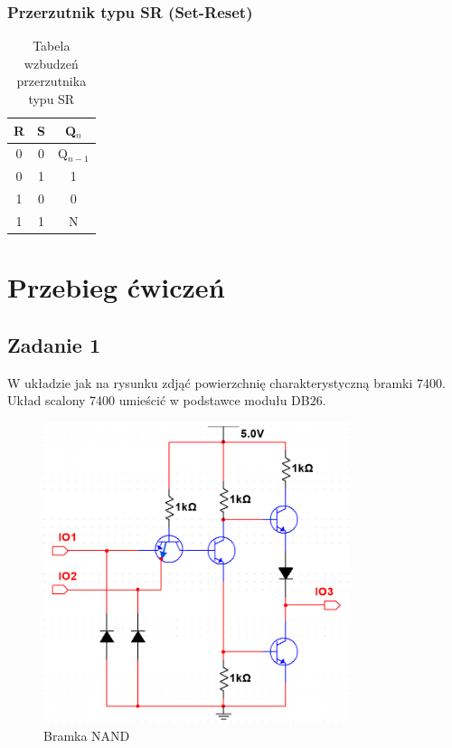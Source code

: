\documentclass{article}
\begin{document}
    \subsubsection{Przerzutnik typu SR (Set-Reset)}
    \begin{table}[H]
    	\centering
    	\begin{tabular}{|c|c|c|}
    		\hline
    		\textbf{R} & \textbf{S} & \textbf{Q$_n$} \\ \hline
    		0 & 0 & Q$_{n-1}$ \\ 
    		0 & 1 & 1 \\ 
    		1 & 0 & 0 \\ 
    		1 & 1 & N \\ 
    		\hline
    	\end{tabular}
    	\caption{Tabela wzbudzeń przerzutnika typu SR}
    \end{table}
    

    \pagebreak

\pagebreak
\section{Przebieg ćwiczeń}
\subsection{Zadanie 1}
W układzie jak na rysunku zdjąć powierzchnię charakterystyczną bramki 7400. Układ
scalony 7400 umieścić w podstawce modułu DB26.

\begin{figure}[h]
    \centering
    \includegraphics[width=0.8\textwidth]{obwod1.PNG}
    \caption{Bramka NAND}
    \label{fig:moj_obrazek}
\end{figure}
\end{document}
